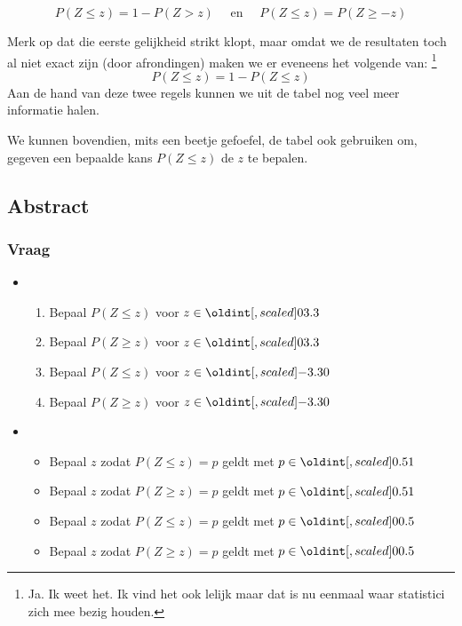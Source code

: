 \documentclass[main.tex]{subfiles}
\begin{document}
\[ P(Z \le z) = 1 - P(Z > z) \quad\text{ en }\quad P(Z \le z) = P(Z \ge -z) \]

Merk op dat die eerste gelijkheid strikt klopt, maar omdat we de resultaten toch al niet exact zijn (door afrondingen) maken we er eveneens het volgende van:
\footnote{Ja. Ik weet het. Ik vind het ook lelijk maar dat is nu eenmaal waar statistici zich mee bezig houden.}
\[ P(Z \le z) = 1 - P(Z \le z) \]
Aan de hand van deze twee regels kunnen we uit de tabel nog veel meer informatie halen.

We kunnen bovendien, mits een beetje gefoefel, de tabel ook gebruiken om, gegeven een bepaalde kans $P(Z \le z)$ de $z$ te bepalen. 

\subsection*{Abstract}
\subsubsection*{Vraag}
\begin{itemize}
\item 
  \begin{enumerate}
  \item Bepaal $P(Z \le z)$ voor $z \in\interval{0}{3.3}$
  \item Bepaal $P(Z \ge z)$ voor $z \in\interval{0}{3.3}$
  \item Bepaal $P(Z \le z)$ voor $z \in\interval{-3.3}{0}$
  \item Bepaal $P(Z \ge z)$ voor $z \in\interval{-3.3}{0}$
  \end{enumerate}
\item
  \begin{itemize}
  \item Bepaal $z$ zodat $P(Z \le z) = p$ geldt met $p \in \interval{0.5}{1}$ 
  \item Bepaal $z$ zodat $P(Z \ge z) = p$ geldt met $p \in \interval{0.5}{1}$
  \item Bepaal $z$ zodat $P(Z \le z) = p$ geldt met $p \in \interval{0}{0.5}$
  \item Bepaal $z$ zodat $P(Z \ge z) = p$ geldt met $p \in \interval{0}{0.5}$
  \end{itemize}
\end{itemize}
\end{document}

